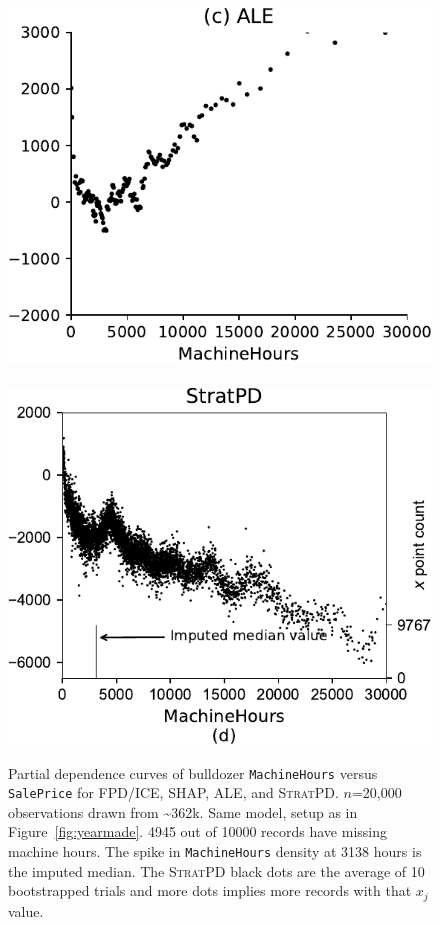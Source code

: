 \documentclass[]{article} %
\newcommand{\figref}[1]{Figure~\ref{#1}}
\newcommand{\spd}{\fontfamily{cmr}\textsc{\small StratPD}}
\begin{document}
\begin{figure}[!htbp]
\begin{center}
\includegraphics[scale=0.35]{images/bulldozer_MachineHours_ale.pdf}~~
\includegraphics[scale=0.35]{images/bulldozer_MachineHours_stratpd.pdf}
\caption{\small Partial dependence curves of bulldozer {\tt MachineHours} versus {\tt SalePrice} for FPD/ICE, SHAP, ALE, and \spd. $n$=20,000 observations drawn from \textasciitilde{}362k. Same model, setup as in \figref{fig:yearmade}. 4945 out of 10000 records have missing machine hours.  The spike in {\tt MachineHours} density at 3138 hours is the imputed median. The \spd{} black dots are the average of 10 bootstrapped trials and more dots implies more records with that $x_j$ value.}
\label{fig:machinehours}
\end{center}
\end{figure}
\end{document}
